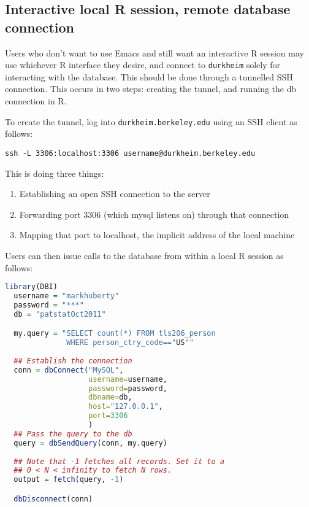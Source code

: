 \documentclass[11pt]{article}
\begin{document}
\subsection{Interactive local R session, remote database connection}
\label{sec:interactive-local-r}

Users who don't want to use Emacs and still want an interactive R
session may use whichever R interface they desire, and connect to
\texttt{durkheim} solely for interacting with the database. This
should be done through a
tunnelled SSH connection. This occurs in two steps: creating the
tunnel, and running the db connection in R.


To create the tunnel, log into \texttt{durkheim.berkeley.edu} using
an SSH client as follows:

\begin{verbatim}
ssh -L 3306:localhost:3306 username@durkheim.berkeley.edu
\end{verbatim}

This is doing three things:
\begin{enumerate}
\item Establishing an open SSH connection to the server
\item Forwarding port 3306 (which mysql listens on) through that connection
\item Mapping that port to localhost, the implicit address of the
  local machine
\end{enumerate}

Users can then issue calls to the database from within a local R
session as follows:

\begin{lstlisting}[language=r, numbers=none, frame=single]
  library(DBI)
  username = "markhuberty"
  password = "***"
  db = "patstatOct2011"

  my.query = "SELECT count(*) FROM tls206_person 
              WHERE person_ctry_code=="US""
  
  ## Establish the connection
  conn = dbConnect("MySQL",
                   username=username,
                   password=password,
                   dbname=db,
                   host="127.0.0.1",
                   port=3306
                   )
  ## Pass the query to the db 
  query = dbSendQuery(conn, my.query)
  
  ## Note that -1 fetches all records. Set it to a 
  ## 0 < N < infinity to fetch N rows.
  output = fetch(query, -1)

  dbDisconnect(conn)
\end{lstlisting}
\end{document}
